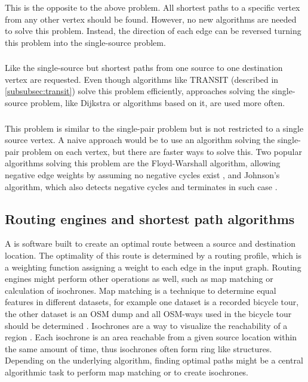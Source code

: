 			This is the opposite to the above problem.
			All shortest paths to a specific vertex from any other vertex should be found.
			However, no new algorithms are needed to solve this problem.
			Instead, the direction of each edge can be reversed turning this problem into the single-source problem.
		
		\subsubsection{}
		
			Like the single-source but shortest paths from one source to one destination vertex are requested.
			Even though algorithms like TRANSIT (described in \cref{subsubsec:transit}) solve this problem efficiently, approaches solving the single-source problem, like Dijkstra or algorithms based on it, are used more often.
		
		\subsubsection{}
		\label{subsubsec:all-pair-shortest-path}
		
			This problem is similar to the single-pair problem but is not restricted to a single source vertex.
			A naive approach would be to use an algorithm solving the single-pair problem on each vertex, but there are faster ways to solve this.
			Two popular algorithms solving this problem are the Floyd-Warshall algorithm, allowing negative edge weights by assuming no negative cycles exist \cite[693]{cormen-introduction-to-alg}, and Johnson's algorithm, which also detects negative cycles and terminates in such case \cite[700]{cormen-introduction-to-alg}.
		
	\subsection{Routing engines and shortest path algorithms}
	\label{subsec:routing-engines}
		
		A  is software built to create an optimal route between a source and destination location.
		The optimality of this route is determined by a routing profile, which is a weighting function assigning a weight to each edge in the input graph.
		Routing engines might perform other operations as well, such as map matching or calculation of isochrones.
		Map matching is a technique to determine equal features in different datasets, for example one dataset is a recorded bicycle tour, the other dataset is an OSM dump and all OSM-ways used in the bicycle tour should be determined \cite{saki-map-matching}.
		Isochrones are a way to visualize the reachability of a region \cite{allen-isochrones}.
		Each isochrone is an area reachable from a given source location within the same amount of time, thus isochrones often form ring like structures.
		Depending on the underlying algorithm, finding optimal paths might be a central algorithmic task to perform map matching or to create isochrones.
		
